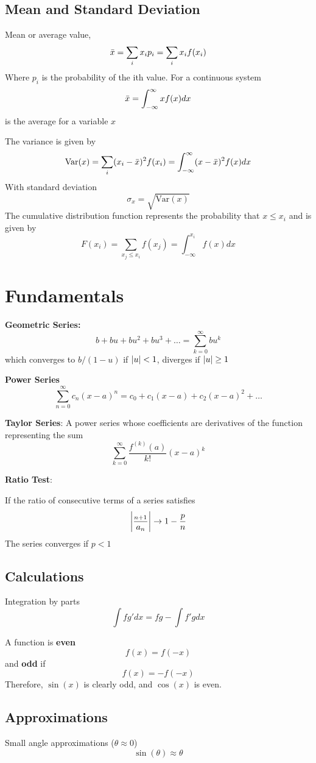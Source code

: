 \documentclass{article}
\begin{document}
\subsection{Mean and Standard Deviation}
Mean or average value, 
$$
\Bar{x} = \sum_i  x_i p_i = \sum_i x_i f(x_i) 
$$
Where $p_i$ is the probability of the ith value.  For a continuous system
$$
\Bar{x} = \int_{-\infty}^{\infty} x f(x) dx
$$
is the average for a variable $x$

The variance is given by 
$$
\text{Var}(x) = \sum_{i}(x_i - \Bar{x})^2 f(x_i) = \int_{-\infty}^{\infty} (x-\Bar{x})^2 f(x) dx
$$
With standard deviation
$$
\sigma_x = \sqrt{\text{Var}(x)}
$$
The cumulative distribution function represents the probability that $x \leq x_i$ and is given by 
$$
F(x_i) = \sum_{x_j\leq x_i} f(x_{j}) = \int_{-\infty}^{x_i} f(x) dx
$$

\section{Fundamentals}
\textbf{Geometric Series:}
$$
b + bu + bu^2 + bu^3  + \dots = \sum_{k=0}^{\infty}bu^k
$$
which converges to $b/(1-u)$ if $\abs{u} < 1$, diverges if $\abs{u} \geq 1$

\textbf{Power Series}
$$
\sum_{n=0}^{\infty} c_n(x-a)^n = c_0 + c_1(x-a) + c_2(x-a)^2 + \dots
$$

\textbf{Taylor Series}:
A power series whose coefficients are derivatives of the function representing the sum
$$
\sum_{k=0}^{\infty} \frac{f^{(k)}(a)}{k!} (x-a)^{k}
$$

\textbf{Ratio Test}:

If the ratio of consecutive terms of a series satisfies 
$$
\abs{\frac{_{n+1}}{a_n}} \to 1-\frac{p}{n}
$$
The series converges if $p<1$

\subsection{Calculations}
Integration by parts
$$
\int fg' dx = fg-\int f' g dx
$$

A function is \textbf{even}
$$
f(x) = f(-x)
$$
and \textbf{odd} if
$$
f(x) = -f(-x)
$$
Therefore, $\sin(x)$  is clearly odd, and $\cos(x)$ is even.
\subsection{Approximations}
Small angle approximations ($\theta \approx 0$)
$$
\sin(\theta) \approx \theta
$$
\end{document}
